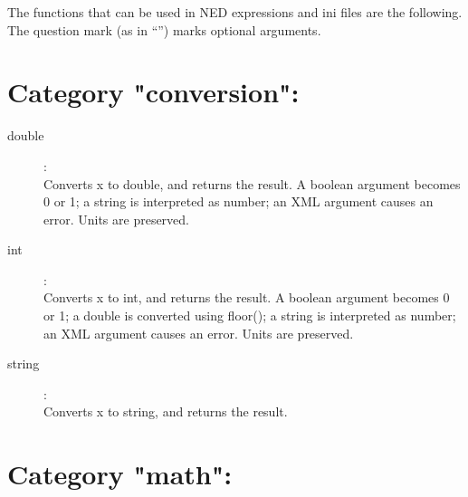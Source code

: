 \label{cha:ned-functions}

The functions that can be used in NED expressions and ini files are the
following. The question mark (as in ``'') marks optional arguments.

%
%

\section{Category "conversion":}
\label{sec:ned-functions:category-conversion}

\begin{description}
\item[double]:  \\
    Converts x to double, and returns the result. A boolean argument becomes 0 or 1; a string is interpreted as number; an XML argument causes an error. Units are preserved.
\item[int]:  \\
    Converts x to int, and returns the result. A boolean argument becomes 0 or 1; a double is converted using floor(); a string is interpreted as number; an XML argument causes an error. Units are preserved.
\item[string]:  \\
    Converts x to string, and returns the result.

\end{description}

\section{Category "math":}
\label{sec:ned-functions:category-math}

